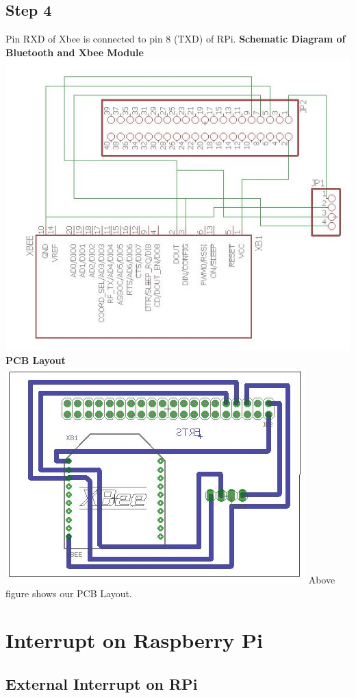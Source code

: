 \documentclass[a4paper,12pt,oneside]{book}
\begin{document}
\subsection*{Step 4}
Pin RXD of Xbee is connected to pin 8 (TXD) of RPi.
\textbf{Schematic Diagram of Bluetooth and Xbee Module}\\
\centering
\includegraphics[scale= 0.8]{zigbee_schematic}
\flushleft
\textbf{PCB Layout}\\
\centering
\includegraphics[scale= 0.5]{zigbee_layout}
\flushleft
Above figure shows our PCB Layout.
\section{Interrupt on Raspberry Pi}
\subsection*{External Interrupt on RPi}
\end{document}
